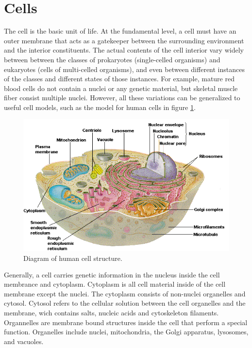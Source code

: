 

\section{Cells}
\par The cell is the basic unit of life. At the fundamental level, a cell must have an outer membrane that acts as a gatekeeper between the surrounding environment and the interior constituents. The actual contents of the cell interior vary widely between between the classes of prokaryotes (single-celled organisms) and eukaryotes (cells of multi-celled organisms), and even between different instances of the classes and different states of those instances. For example, mature red blood cells do not contain a nuclei or any genetic material, but skeletal muscle fiber consist multiple nuclei. However, all these variations can be generalized to useful cell models, such as the model for human cells in figure \ref{fig:human_cell_model}.   
\begin{figure}[ht]
 \centering
 \includegraphics[width=\textwidth]{images/humanCellOverview.png}
 \caption[Diagram of human cell structure.]{Diagram of human cell structure. \cite{daniel_d_chiras_human_2005} }
 \label{fig:human_cell_model}
 \end{figure}
 
 
 \par Generally, a cell carries genetic information in the nucleus inside the cell membrance and cytoplasm. Cytoplasm is all cell material inside of the cell membrane except the nuclei. The cytoplasm consists of non-nuclei organelles and cytosol.  Cytosol refers to the cellular solution between the cell organelles and the membrane, wich contains salts, nucleic acids and cytoskeleton filaments. Organnelles are membrane bound structures inside the cell that perform a special function. Organelles include nuclei, mitochondria, the Golgi apparatus, lysosomes, and vacuoles.  
 
